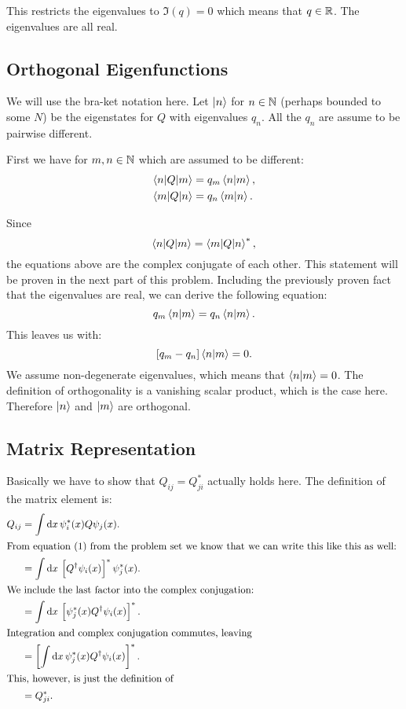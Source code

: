 \documentclass[11pt, ngerman, fleqn, DIV=15, headinclude]{scrartcl}
\begin{document}
This restricts the eigenvalues to $\Im(q) = 0$ which means that $q \in \mathbb R$. The
eigenvalues are all real.

\subsection{Orthogonal Eigenfunctions}

We will use the bra-ket notation here. Let $\ket n$ for $n \in \mathbb N$ (perhaps
bounded to some $N$) be the eigenstates for $Q$ with eigenvalues $q_n$. All the
$q_n$ are assume to be pairwise different.

First we have for $m, n \in \mathbb N$ which are assumed to be different:
\begin{align*}
    \braket{n | Q | m} &= q_m \braket{n | m}, \\
    \braket{m | Q | n} &= q_n \braket{m | n}.
\end{align*}

Since
\[
    \braket{n | Q | m} = \braket{m | Q | n}^*,
\]
the equations above are the complex conjugate of each other. This statement
will be proven in the next part of this problem. Including the previously
proven fact that the eigenvalues are real, we can derive the following
equation:
\[
    q_m \braket{n|m} = q_n \braket{n|m}.
\]
This leaves us with:
\[
    [q_m - q_n] \braket{n|m} = 0.
\]
We assume non-degenerate eigenvalues, which means that $\braket{n|m} = 0$. The
definition of orthogonality is a vanishing scalar product, which is the case
here. Therefore $\ket n$ and $\ket m$ are orthogonal.

\subsection{Matrix Representation}

Basically we have to show that $Q_{ij} = Q_{ji}^*$ actually holds here. The
definition of the matrix element is:
\begin{align*}
    Q_{ij}
    &= \int \dif x \, \psi_i^*(x) Q \psi_j(x). \\
    \intertext{%
        From equation~(1) from the problem set we know that we can write this
        like this as well:
    }
    &= \int \dif x \, \sbr{Q^\dagger \psi_i(x)}^* \psi_j^*(x). \\
    \intertext{%
        We include the last factor into the complex conjugation:
    }
    &= \int \dif x \, \sbr{\psi_j^*(x) Q^\dagger \psi_i(x)}^*. \\
    \intertext{%
        Integration and complex conjugation commutes, leaving
    }
    &= \sbr{ \int \dif x \, \psi_j^*(x) Q^\dagger \psi_i(x)}^*. \\
    \intertext{%
        This, however, is just the definition of
    }
    &= Q_{ji}^*.
\end{align*}
\end{document}
